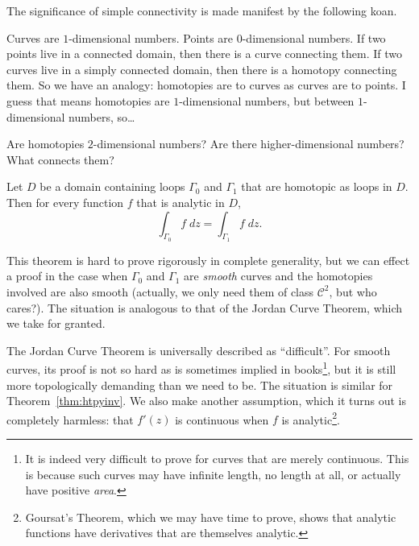 \documentclass[twocolumn,12pt]{article}
\begin{document}
The significance of simple connectivity is made manifest by the following koan.
\begin{koan}
Curves are $1$-dimensional numbers. Points are $0$-dimensional numbers. If two points live in a connected domain, then there is a curve connecting them. If two curves live in a simply connected domain, then there is a homotopy connecting them. So we have an analogy: homotopies are to curves as curves are to points. I guess that means homotopies are $1$-dimensional numbers, but between $1$-dimensional numbers, so\ldots

Are homotopies $2$-dimensional numbers? Are there higher-dimensional numbers? What connects them? 
\end{koan}
\begin{Theorem} \label{thm:htpyinv}
    Let $D$ be a domain containing loops $\Gamma_0$ and $\Gamma_1$ that are homotopic as loops in $D$. Then for every function $f$ that is analytic in $D$,
    \[
        \int_{\Gamma_0} f \; dz = \int_{\Gamma_1} f \; dz.
    \]
\end{Theorem}
This theorem is hard to prove rigorously in complete generality, but we can effect a proof in the case when $\Gamma_0$ and $\Gamma_1$ are \emph{smooth} curves and the homotopies involved are also smooth (actually, we only need them of class $\mathcal{C}^2$, but who cares?). The situation is analogous to that of the Jordan Curve Theorem, which we take for granted.

The Jordan Curve Theorem is universally described as ``difficult''. For smooth curves, its proof is not so hard as is sometimes implied in books\footnote{It is indeed very difficult to prove for curves that are merely continuous. This is because such curves may have infinite length, no length at all, or actually have positive \emph{area}.}, but it is still more topologically demanding than we need to be. The situation is similar for Theorem~\ref{thm:htpyinv}. We also make another assumption, which it turns out is completely harmless: that $f'(z)$ is continuous when $f$ is analytic\footnote{Goursat's Theorem, which we may have time to prove, shows that analytic functions have derivatives that are themselves analytic.}.
\end{document}
